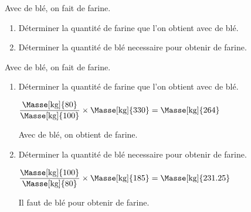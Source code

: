 \begin{exercice}
    Avec  de blé, on fait  de farine.
    \begin{enumerate}
        \item Déterminer la quantité de farine que l'on obtient avec  de blé.
        \item Déterminer la quantité de blé necessaire pour obtenir  de farine.
    \end{enumerate}
\end{exercice}
\begin{corrige}
    Avec  de blé, on fait  de farine.
    \begin{enumerate}
        \item Déterminer la quantité de farine que l'on obtient avec  de blé.
        
        {\red $\dfrac{\text{\Masse[kg]{80}}}{\text{\Masse[kg]{100}}}\times \text{\Masse[kg]{330}}=\text{\Masse[kg]{264}}$

        Avec  de blé, on obtient  de farine.
        }
        \item Déterminer la quantité de blé necessaire pour obtenir  de farine.

        {\red $\dfrac{\text{\Masse[kg]{100}}}{\text{\Masse[kg]{80}}}\times \text{\Masse[kg]{185}}=\text{\Masse[kg]{231.25}}$

        Il faut  de blé pour obtenir  de farine.
        }        
    \end{enumerate}    
\end{corrige}